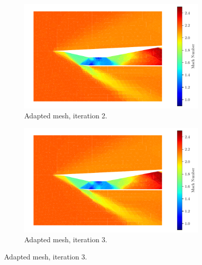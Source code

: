 \begin{figure}[h!]
    \begin{subfigure}[h]{0.49\linewidth}
        \centering
        \includegraphics[width=\linewidth]{rep/q4/Machfield2.pdf}
        \caption{Adapted mesh, iteration 2.}
    \end{subfigure}
    \begin{subfigure}[h]{0.49\linewidth}
        \centering
        \includegraphics[width=\linewidth]{rep/q4/Machfield3.pdf}
        \caption{Adapted mesh, iteration 3.}
    \end{subfigure}


\end{figure}
